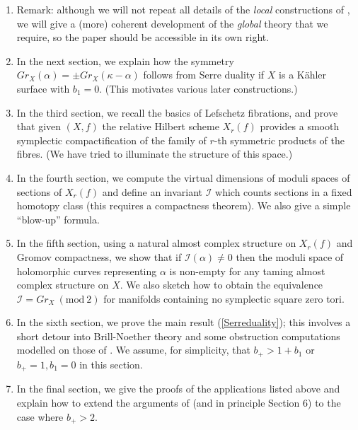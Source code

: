\documentclass[10pt]{article}
\newcounter{enum}
\begin{document}
\begin{enumerate}

\item Remark: although we will not repeat all details of the
  \emph{local} constructions of \cite{SKDIS}, we will give a (more) coherent
  development of the \emph{global} theory that we require, so the
  paper should be accessible in its own right.

\item In the next section, we explain how the symmetry $Gr_X(\alpha) =
  \pm Gr_X(\kappa-\alpha)$ follows from Serre duality if $X$ is a K\"ahler
  surface with $b_1=0$.  (This motivates various later constructions.)

\item In the third section, we recall the basics of Lefschetz
  fibrations, and prove that given $(X,f)$ the relative Hilbert scheme
  $X_r(f)$ provides a smooth symplectic
  compactification of the family of $r$-th symmetric products of
  the fibres.  (We have tried to illuminate the structure of this space.)

\item In the fourth section, we compute the virtual dimensions of
  moduli spaces of 
  sections of $X_r(f)$  and define an invariant $\mathcal{I}$
  which counts sections in a fixed homotopy class (this requires a
  compactness theorem).  We also give a simple ``blow-up'' formula.

\item In the fifth section, using a natural almost
  complex structure on $X_r(f)$ and Gromov compactness, we show that
  if $\mathcal{I}(\alpha) \neq 0$ then the moduli space of holomorphic
  curves representing $\alpha$ is non-empty for any taming almost
  complex structure on $X$.  We also sketch how to obtain the equivalence
  $\mathcal{I} = Gr_X \  (\mathrm{mod} \ 2)$ for manifolds containing
  no symplectic square zero tori.

\item In the sixth section, we prove the main result
  (\ref{Serreduality}); this involves a short detour into
  Brill-Noether theory and some obstruction computations modelled on
  those of \cite{SKDIS}.  We assume, for simplicity, that $b_+ >
  1+b_1$ or $b_+ = 1, b_1 = 0$ in this section.

\item In the final section, we give the proofs of the applications
  listed above and explain how to extend the arguments of
  \cite{SKDIS} (and in principle Section 6) to the case where $b_+ > 2$.
\end{enumerate}
\end{document}
